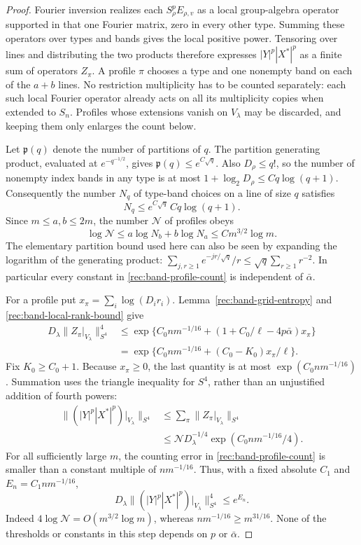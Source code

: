 \begin{proof}
Fourier inversion realizes each $S_\rho^pE_{\rho,v}$ as a local
group-algebra operator supported in that one Fourier matrix,
zero in every other type.  Summing these operators over types
and bands gives the local positive power.  Tensoring over lines
and distributing the two products therefore expresses
$|Y|^p|X^*|^p$ as a finite sum of operators $Z_\pi$.
A profile $\pi$ chooses a type and one nonempty band on each
of the $a+b$ lines.  No restriction multiplicity has to be
counted separately: each such local Fourier operator already
acts on all its multiplicity copies when extended to $S_n$.
Profiles whose extensions vanish on $V_\lambda$ may be
discarded, and keeping them only enlarges the count below.

Let $\mathfrak p(q)$ denote the number of partitions of $q$.
The partition generating product, evaluated at $e^{-q^{-1/2}}$,
gives $\mathfrak p(q)\le e^{C\sqrt q}$.  Also
$D_\rho\le q!$, so the number of nonempty index bands in any
type is at most $1+\log_2D_\rho\le Cq\log(q+1)$.
Consequently the number $N_q$ of type-band choices on a line
of size $q$ satisfies
\[
 N_q\le e^{C\sqrt q}\,Cq\log(q+1).
\]
Since $m\le a,b\le2m$, the number $\mathcal N$ of profiles obeys
\begin{equation}\label{rec:band-profile-count}
 \log\mathcal N
 \le a\log N_b+b\log N_a
 \le C m^{3/2}\log m.
\end{equation}
The elementary partition bound used here can also be seen by
expanding the logarithm of the generating product:
$\sum_{j,r\ge1}e^{-jr/\sqrt q}/r
\le\sqrt q\sum_{r\ge1}r^{-2}$.
In particular every constant in \eqref{rec:band-profile-count}
is independent of $\bar\alpha$.

For a profile put $x_\pi=\sum_i\log(D_ir_i)$.
Lemma~\ref{rec:band-grid-entropy} and
\eqref{rec:band-local-rank-bound} give
\[
 \begin{split}
 D_\lambda\|Z_\pi|_{V_\lambda}\|_{S^4}^4
 &\le
 \exp\{C_0n m^{-1/16}
       +(1+C_0/\ell-4p\bar\alpha)x_\pi\}\\
 &=
 \exp\{C_0n m^{-1/16}
       +(C_0-K_0)x_\pi/\ell\}.
 \end{split}
\]
Fix $K_0\ge C_0+1$.  Because $x_\pi\ge0$, the last
quantity is at most $\exp(C_0n m^{-1/16})$.
Summation uses the triangle inequality for $S^4$, rather
than an unjustified addition of fourth powers:
\[
 \begin{split}
 \big\|(|Y|^p|X^*|^p)|_{V_\lambda}\big\|_{S^4}
 &\le\sum_\pi\|Z_\pi|_{V_\lambda}\|_{S^4}\\
 &\le\mathcal N D_\lambda^{-1/4}
                  \exp(C_0n m^{-1/16}/4).
 \end{split}
\]
For all sufficiently large $m$, the counting error in
\eqref{rec:band-profile-count} is smaller than a constant
multiple of $n m^{-1/16}$.  Thus, with a fixed absolute
$C_1$ and $E_n=C_1n m^{-1/16}$,
\begin{equation}\label{rec:band-summed-fourth}
 D_\lambda
 \big\|(|Y|^p|X^*|^p)|_{V_\lambda}\big\|_{S^4}^4
 \le e^{E_n}.
\end{equation}
Indeed $4\log\mathcal N=O(m^{3/2}\log m)$, whereas
$n m^{-1/16}\ge m^{31/16}$.  None of the thresholds or
constants in this step depends on $p$ or $\bar\alpha$.


\end{proof}

